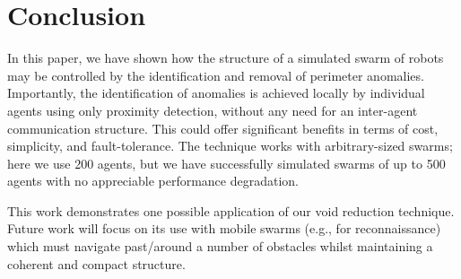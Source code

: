 \documentclass[letterpaper]{article}
\begin{document}
\section{Conclusion}
\label{voids:Conclusion}

In this paper, we have shown how the structure of a simulated swarm of robots may be controlled by the identification and removal of perimeter anomalies. Importantly, the identification of anomalies is achieved locally by individual agents using only proximity detection, without any need for an inter-agent communication structure. This could offer significant benefits in terms of cost, simplicity, and fault-tolerance. The technique works with arbitrary-sized swarms; here we use 200 agents, but we have successfully simulated swarms of up to 500 agents with no appreciable performance degradation.

This work demonstrates one possible application of our void reduction technique. Future work will focus on its use with mobile swarms (e.g., for reconnaissance) which must navigate past/around a number of obstacles whilst maintaining a coherent and compact structure.


\footnotesize


\end{document}
